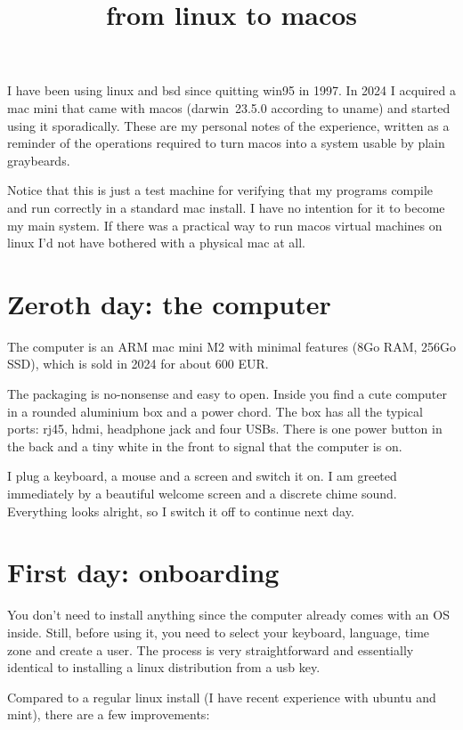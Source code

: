 \title{from linux to macos}

I have been using linux and bsd since quitting win95 in 1997.  In 2024 I
acquired a mac mini that came with macos (darwin~23.5.0 according to
uname) and started using it sporadically.  These are my personal notes of the
experience, written as a reminder of the operations required to turn macos
into a system usable by plain graybeards.

Notice that this is just a test machine for verifying that my programs
compile and run correctly in a standard mac install.  I have no intention for
it to become my main system.  If there was a practical way to run macos
virtual machines on linux I'd not have bothered with a physical mac at all.

\section*{Zeroth day: the computer}

The computer is an ARM mac mini M2 with minimal features (8Go RAM, 256Go
SSD), which is sold in 2024 for about 600 EUR.

The packaging is no-nonsense and easy to open.  Inside you find a cute
computer in a rounded aluminium box and a power chord.  The box has all the
typical ports: rj45, hdmi, headphone jack and four USBs.  There is one
power button in the back and a tiny white in the front to signal that
the computer is on.

I plug a keyboard, a mouse and a screen and switch it on.  I am greeted
immediately by a beautiful welcome screen and a discrete chime sound.
Everything looks alright, so I switch it off to continue next day.

\section*{First day: onboarding}

You don't need to install anything since the computer already comes with an
OS inside.  Still, before using it, you need to select your keyboard,
language, time zone and create a user.  The process is very straightforward
and essentially identical to installing a linux distribution from a usb key.

Compared to a regular linux install (I have recent experience with ubuntu and
mint), there are a few improvements:

